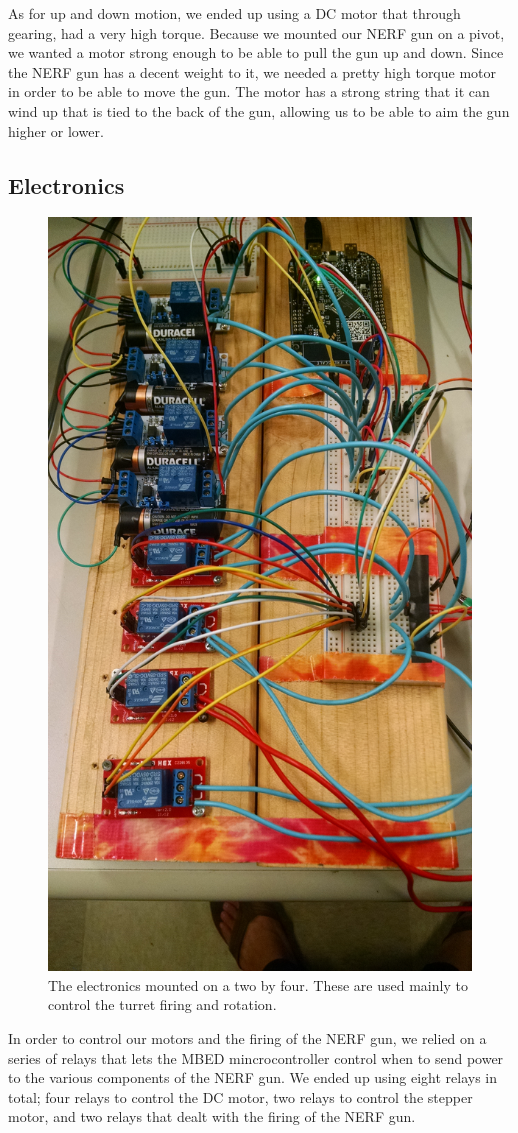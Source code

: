 \documentclass[journal]{IEEEtran}
\begin{document}
As for up and down motion, we ended up using a DC motor that through gearing, had a very high torque. Because we mounted our NERF gun on a pivot, we wanted a motor strong enough to be able to pull the gun up and down. Since the NERF gun has a decent weight to it, we needed a pretty high torque motor in order to be able to move the gun. The motor has a strong string that it can wind up that is tied to the back of the gun, allowing us to be able to aim the gun higher or lower.

\subsection{Electronics}

\begin{figure}[htbp]
    \centering
    \includegraphics[width=0.60\linewidth]{electronics.jpg}
    \caption{The electronics mounted on a two by four. These are used mainly to control the turret firing and rotation.}
    \label{fig:electronics}
\end{figure}

In order to control our motors and the firing of the NERF gun, we relied on a series of relays that lets the MBED mincrocontroller control when to send power to the various components of the NERF gun. We ended up using eight relays in total; four relays to control the DC motor, two relays to control the stepper motor, and two relays that dealt with the firing of the NERF gun.
\end{document}
